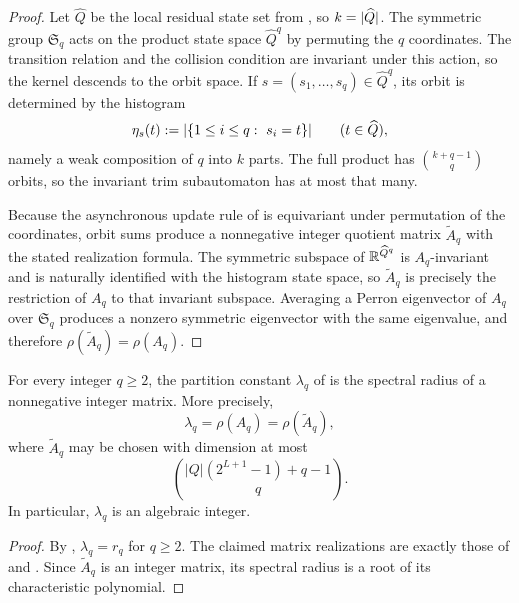 \begin{proof}
Let \(\widehat Q\) be the local residual state set from
, so \(k=\lvert \widehat Q \rvert\).  The
symmetric group \(\mathfrak S_q\) acts on the product state space
\(\widehat Q^q\) by permuting the \(q\) coordinates.  The transition relation
and the collision condition are invariant under this action, so the kernel
descends to the orbit space.  If \(s=(s_1,\dots,s_q)\in \widehat Q^q\), its
orbit is determined by the histogram
\[
  \eta_s(t):=\lvert \{1\le i\le q:\ s_i=t\} \rvert
  \qquad (t\in \widehat Q),
\]
namely a weak composition of \(q\) into \(k\) parts.  The full product has
\(\binom{k+q-1}{q}\) orbits, so the invariant trim subautomaton has at most
that many.

Because the asynchronous update rule of
 is equivariant under permutation of the
coordinates, orbit sums produce a nonnegative integer quotient matrix
\(\widetilde A_q\)
with the stated realization formula.  The symmetric subspace of
\(\mathbb{R}^{\widehat Q^q}\) is \(A_q\)-invariant and is naturally identified with
the histogram state space, so \(\widetilde A_q\) is precisely the restriction
of \(A_q\) to that invariant subspace.  Averaging a Perron eigenvector of
\(A_q\) over \(\mathfrak S_q\) produces a nonzero symmetric eigenvector with
the same eigenvalue, and therefore \(\rho(\widetilde A_q)=\rho(A_q)\).
\end{proof}

\begin{corollary}
\label{cor:lambda-algebraic}
For every integer \(q\ge 2\), the partition constant \(\lambda_q\) of
 is the spectral radius of a nonnegative integer
matrix.  More precisely,
\[
  \lambda_q=\rho(A_q)=\rho(\widetilde A_q),
\]
where \(\widetilde A_q\) may be chosen with dimension at most
\[
  \binom{|Q|(2^{L+1}-1)+q-1}{q}.
\]
In particular, \(\lambda_q\) is an algebraic integer.
\end{corollary}

\begin{proof}
By , \(\lambda_q=r_q\) for \(q\ge 2\).  The claimed
matrix realizations are exactly those of  and
.  Since \(\widetilde A_q\) is an integer
matrix, its spectral radius is a root of its characteristic polynomial.
\end{proof}

